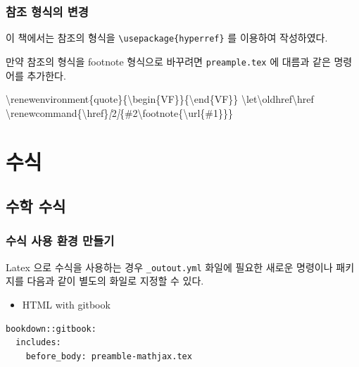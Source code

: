 \documentclass[
]{book}
\newenvironment{Shaded}{\begin{snugshade}}{\end{snugshade}}
\newcommand{\CommentTok}[1]{\textcolor[rgb]{0.56,0.35,0.01}{\textit{#1}}}
\newcommand{\NormalTok}[1]{#1}
\newcommand{\OtherTok}[1]{\textcolor[rgb]{0.56,0.35,0.01}{#1}}
\providecommand{\tightlist}{%
  \setlength{\itemsep}{0pt}\setlength{\parskip}{0pt}}
\theoremstyle{definition}
\theoremstyle{definition}
\theoremstyle{definition}
\theoremstyle{definition}
\theoremstyle{remark}
\begin{document}
\hypertarget{uxcc38uxc870-uxd615uxc2dduxc758-uxbcc0uxacbd}{%
\subsection{참조 형식의 변경}\label{uxcc38uxc870-uxd615uxc2dduxc758-uxbcc0uxacbd}}

이 책에서는 참조의 형식을 \texttt{\textbackslash{}usepackage\{hyperref\}} 를 이용하여 작성하였다.

만약 참조의 형식을 footnote 형식으로 바꾸려면 \texttt{preample.tex} 에 대름과 같은 명령어를 추가한다.

\begin{Shaded}
\begin{Highlighting}[]
\NormalTok{\textbackslash{}renewenvironment\{quote\}\{\textbackslash{}begin\{VF\}\}\{\textbackslash{}end\{VF\}\}}
\NormalTok{\textbackslash{}let\textbackslash{}oldhref\textbackslash{}href}
\NormalTok{\textbackslash{}renewcommand\{\textbackslash{}href\}}\CommentTok{[}\OtherTok{2}\CommentTok{]}\NormalTok{\{\#2\textbackslash{}footnote\{\textbackslash{}url\{\#1\}\}\}}
\end{Highlighting}
\end{Shaded}

\hypertarget{math}{%
\chapter{수식}\label{math}}

\hypertarget{uxc218uxd559-uxc218uxc2dd}{%
\section{수학 수식}\label{uxc218uxd559-uxc218uxc2dd}}

\hypertarget{uxc218uxc2dd-uxc0acuxc6a9-uxd658uxacbd-uxb9ccuxb4e4uxae30}{%
\subsection{수식 사용 환경 만들기}\label{uxc218uxc2dd-uxc0acuxc6a9-uxd658uxacbd-uxb9ccuxb4e4uxae30}}

Latex 으로 수식을 사용하는 경우 \texttt{\_outout.yml} 화일에 필요한 새로운 명령이나 패키지를 다음과 같이 별도의 화일로 지정할 수 있다.

\begin{itemize}
\tightlist
\item
  HTML with gitbook
\end{itemize}

\begin{verbatim}
bookdown::gitbook:
  includes:
    before_body: preamble-mathjax.tex
\end{verbatim}
\end{document}

